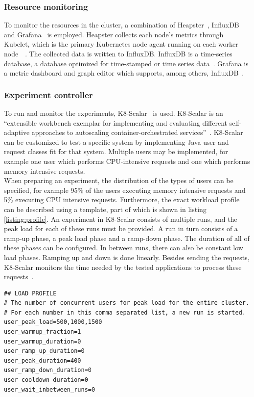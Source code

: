 \subsubsection{Resource monitoring}
To monitor the resources in the cluster, a combination of Heapster~\citep{heapster}, InfluxDB~\citep{influxdb} and Grafana~\citep{grafana} is employed. Heapster collects each node's metrics through Kubelet, which is the primary Kubernetes node agent running on each worker node~\citep{kubelet}~\citep{heapster-influxdb-grafana}. The collected data is written to InfluxDB. InfluxDB is a time-series database, a database optimized for time-stamped or time series data~\citep{timeseriesdb}. Grafana is a metric dashboard and graph editor which supports, among others, InfluxDB~\citep{grafana-github}. 

\subsubsection{Experiment controller}
To run and monitor the experiments, K8-Scalar~\citep{scalar} is used. K8-Scalar is an ``extensible workbench exemplar for implementing and evaluating different self-adaptive approaches to autoscaling container-orchestrated services''~\citep{scalar-github-overview}. K8-Scalar can be customized to test a specific system by implementing Java user and request classes fit for that system. Multiple users may be implemented, for example one user which performs CPU-intensive requests and one which performs memory-intensive requests. \\

When preparing an experiment, the distribution of the types of users can be specified, for example 95\% of the users executing memory intensive requests and 5\% executing CPU intensive requests. Furthermore, the exact workload profile can be described using a template, part of which is shown in listing \ref{listing:profile}. An experiment in K8-Scalar consists of multiple runs, and the peak load for each of these runs must be provided. A run in turn consists of a ramp-up phase, a peak load phase and a ramp-down phase. The duration of all of these phases can be configured. In between runs, there can also be constant low load phases. Ramping up and down is done linearly. Besides sending the requests, K8-Scalar monitors the time needed by the tested applications to process these requests~\citep{scalar}.

\begin{lstlisting}[float,floatplacement=H]
## LOAD PROFILE
# The number of concurrent users for peak load for the entire cluster. 
# For each number in this comma separated list, a new run is started.
user_peak_load=500,1000,1500
user_warmup_fraction=1
user_warmup_duration=0
user_ramp_up_duration=0
user_peak_duration=400
user_ramp_down_duration=0
user_cooldown_duration=0
user_wait_inbetween_runs=0
\end{lstlisting}

